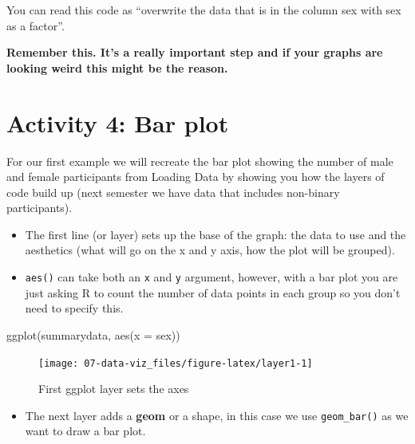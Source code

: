 \documentclass[
  oneside]{book}
\newenvironment{Shaded}{\begin{snugshade}}{\end{snugshade}}
\newcommand{\AttributeTok}[1]{\textcolor[rgb]{0.77,0.63,0.00}{#1}}
\newcommand{\FunctionTok}[1]{\textcolor[rgb]{0.00,0.00,0.00}{#1}}
\newcommand{\NormalTok}[1]{#1}
\providecommand{\tightlist}{%
  \setlength{\itemsep}{0pt}\setlength{\parskip}{0pt}}
\begin{document}
You can read this code as ``overwrite the data that is in the column sex with sex as a factor''.

\textbf{Remember this. It's a really important step and if your graphs are looking weird this might be the reason.}

\hypertarget{activity-4-bar-plot}{%
\section{Activity 4: Bar plot}\label{activity-4-bar-plot}}

For our first example we will recreate the bar plot showing the number of male and female participants from Loading Data by showing you how the layers of code build up (next semester we have data that includes non-binary participants).

\begin{itemize}
\tightlist
\item
  The first line (or layer) sets up the base of the graph: the data to use and the aesthetics (what will go on the x and y axis, how the plot will be grouped).\\
\item
  \texttt{aes()} can take both an \texttt{x} and \texttt{y} argument, however, with a bar plot you are just asking R to count the number of data points in each group so you don't need to specify this.
\end{itemize}

\begin{Shaded}
\begin{Highlighting}[]
\FunctionTok{ggplot}\NormalTok{(summarydata, }\FunctionTok{aes}\NormalTok{(}\AttributeTok{x =}\NormalTok{ sex))}
\end{Highlighting}
\end{Shaded}

\begin{figure}

{\centering \texttt{[image: 07-data-viz\_files/figure-latex/layer1-1]} 

}

\caption{First ggplot layer sets the axes}\label{fig:layer1}
\end{figure}

\begin{itemize}
\tightlist
\item
  The next layer adds a \textbf{geom} or a shape, in this case we use \texttt{geom\_bar()} as we want to draw a bar plot.
\end{itemize}
\end{document}
